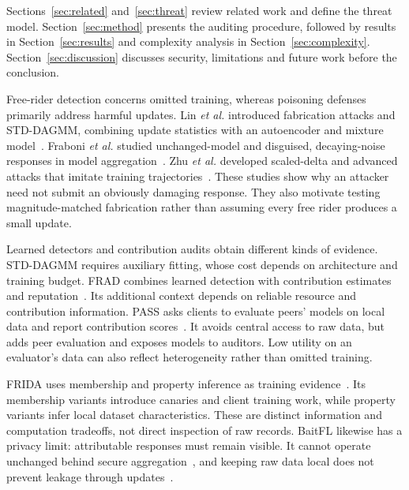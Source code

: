 \documentclass[journal]{IEEEtran}
\makeatletter
\renewcommand{\section}{\@startsection{section}{1}{\z@}{1.5ex}{0.7ex}{\normalfont\normalsize\centering\scshape}}
\makeatother
\begin{document}
Sections~\ref{sec:related} and~\ref{sec:threat} review related work and
define the threat model. Section~\ref{sec:method} presents the auditing
procedure, followed by results in Section~\ref{sec:results} and complexity
analysis in Section~\ref{sec:complexity}. Section~\ref{sec:discussion}
discusses security, limitations and future work before the conclusion.

\section{Literature Review}\label{sec:related}
Free-rider detection concerns omitted training, whereas poisoning
defenses primarily address harmful updates. Lin \emph{et al.} introduced
fabrication attacks and STD-DAGMM, combining update statistics with an
autoencoder and mixture model~\cite{lin2019freeriders,zong2018dagmm}.
Fraboni \emph{et al.} studied unchanged-model and disguised, decaying-noise
responses in model aggregation~\cite{fraboni2021freerider}. Zhu \emph{et al.}
developed scaled-delta and advanced attacks that imitate training
trajectories~\cite{zhu2021advanced}. These studies show why an attacker
need not submit an obviously damaging response. They also motivate
testing magnitude-matched fabrication rather than assuming every free
rider produces a small update.

Learned detectors and contribution audits obtain different kinds of
evidence. STD-DAGMM requires auxiliary fitting, whose cost depends on
architecture and training budget. FRAD combines learned detection with
contribution estimates and reputation~\cite{wang2024frad}. Its additional
context depends on reliable resource and contribution information.
PASS asks clients to evaluate peers' models on local data and report
contribution scores~\cite{wang2024pass}. It avoids central access to raw
data, but adds peer evaluation and exposes models to auditors. Low
utility on an evaluator's data can also reflect heterogeneity rather
than omitted training.

FRIDA uses membership and property inference as training
evidence~\cite{recasens2026frida}. Its membership variants introduce
canaries and client training work, while property variants infer local
dataset characteristics. These are distinct information and computation
tradeoffs, not direct inspection of raw records. BaitFL likewise has a
privacy limit: attributable responses must remain visible. It cannot
operate unchanged behind secure aggregation~\cite{bonawitz2017practical},
and keeping raw data local does not prevent leakage through
updates~\cite{zhu2019leakage,melis2019leakage}.
\end{document}
